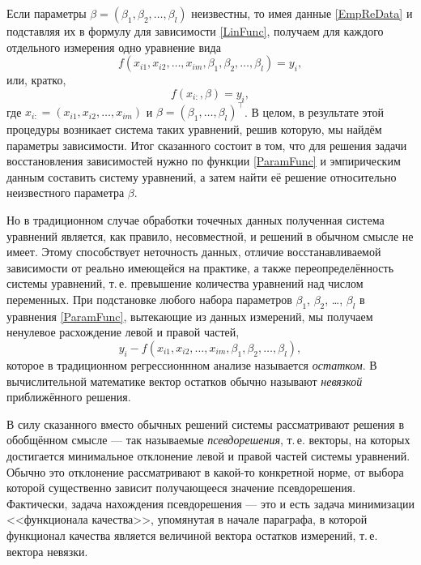 \documentclass[a5paper,openany]{book}
\begin{document}
Если параметры $\beta = (\beta_{1}, \beta_{2}, \ldots, \beta_{l})$ неизвестны, 
то имея данные \eqref{EmpReData} и подставляя их в формулу для зависимости 
\eqref{LinFunc}, получаем для каждого отдельного измерения одно уравнение вида 
\begin{equation*} 
f(x_{i1}, x_{i2}, \ldots, x_{im}, \beta_{1}, \beta_{2}, \ldots, \beta_{l}) = y_{i}, 
\end{equation*} 
или, кратко, 
\begin{equation*} 
f( x_{i:}, \beta) = y_{i}, 
\end{equation*} 
где $x_{i:} = (x_{i1}, x_{i2}, \ldots, x_{im})$ и $\beta = (\beta_1, \ldots, 
\beta_l)^\top$. В целом, в результате этой процедуры возникает система таких уравнений, 
решив которую, мы найдём параметры зависимости. Итог сказанного состоит в том, что 
для решения задачи восстановления зависимостей нужно по функции \eqref{ParamFunc} 
и эмпирическим данным составить систему уравнений, а затем найти её решение 
относительно неизвестного параметра $\beta$. 
  
Но в традиционном случае обработки точечных данных полученная система уравнений является, 
как правило, несовместной, и решений в обычном смысле не имеет. Этому способствует 
неточность данных, отличие восстанавливаемой зависимости от реально имеющейся на практике, 
а также переопределённость системы уравнений, т.\,е. превышение количества уравнений над 
числом переменных. При подстановке любого набора параметров $\beta_1$, $\beta_2$, \ldots, 
$\beta_l$  в уравнения \eqref{ParamFunc}, вытекающие из данных измерений, мы получаем 
ненулевое расхождение левой и правой частей, 
\begin{equation*} 
y_{i} - f(x_{i1}, x_{i2}, \ldots, x_{im}, \beta_{1}, \beta_{2}, \ldots, \beta_{l}), 
\end{equation*} 
которое в традиционном регрессионнном анализе называется \emph{остатком}. 
В вычислительной математике вектор остатков обычно называют \emph{невязкой} 
приближённого решения. 
  
В силу сказанного вместо обычных решений системы рассматривают решения в обобщённом 
смысле --- так называемые \emph{псевдорешения}, т.\,е. векторы, 
на которых достигается минимальное отклонение левой и правой частей системы уравнений. 
Обычно это отклонение рассматривают в какой-то конкретной норме, от выбора которой 
существенно зависит получающееся значение псевдорешения. Фактически, задача нахождения 
псевдорешения --- это и есть задача минимизации <<функционала качества>>, упомянутая 
в начале параграфа, в которой функционал качества является величиной вектора 
остатков измерений, т.\,е. вектора невязки. 
   
\end{document}
